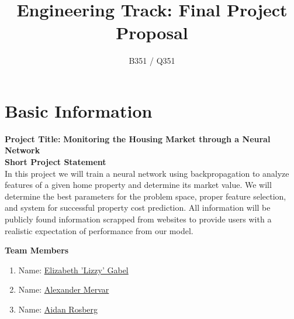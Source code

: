 \documentclass[]{article}
\title{\vspace{-2.5cm}Engineering Track: Final Project Proposal}
\author{B351 / Q351}
\date{}
\begin{document}
\maketitle

\section*{Basic Information}

\begin{multicols}{2}
	
\textbf{Project Title:} {\textbf{Monitoring the Housing Market through a Neural Network}}\\

\vspace{0.25cm}
\textbf{Short Project Statement}\\
In this project we will train a neural network using backpropagation to analyze features of a given home property and determine its market value.  We will determine the best parameters for the problem space, proper feature selection, and system for successful property cost prediction.  All information will be publicly found information scrapped from websites to provide users with a realistic expectation of performance from our model.

\columnbreak
\textbf{Team Members}
\begin{enumerate}
	
	\vspace{0.5cm}
	\item Name: \underline{Elizabeth 'Lizzy' Gabel}
	
	\vspace{0.25cm}
	\item Name: \underline{Alexander Mervar}
	
	\vspace{0.25cm}
	\item Name: \underline{Aidan Rosberg}
	
	
\end{enumerate}

\end{multicols}
\end{document}
